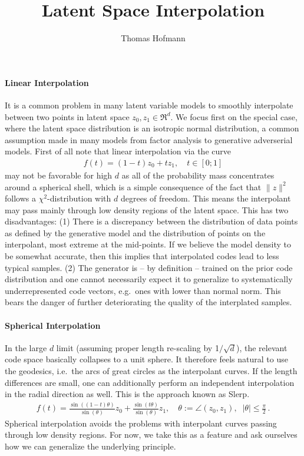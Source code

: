 \documentclass{article}
\author{Thomas Hofmann}
\title{Latent Space Interpolation}
\begin{document}
\maketitle

\paragraph{Linear Interpolation} It is a common problem in many latent variable models to smoothly interpolate between two points in latent space $z_0,z_1 \in \Re^d$. We focus first on the special case, where the latent space distribution is an isotropic normal distribution, a common assumption made in many models from factor analysis to generative adverserial models. 
%
First of all note that linear interpolation via the curve
\begin{align}
f(t) = (1-t) z_0 + t z_1, \quad t \in [0;1]
\end{align}
may not be favorable for high $d$ as all of the probability mass concentrates around a spherical shell, which is a simple consequence  of the fact that $\|z\|^2$ follows a $\chi^2$-distribution with $d$ degrees of freedom. This means the interpolant may pass mainly through low density regions of the latent space. This has two disadvantages: (1) There is a discrepancy between the distribution of data points as defined by the generative model and the distribution of points on the interpolant, most extreme at the mid-points. If we believe the model density to be somewhat accurate, then this  implies that interpolated codes lead to less typical samples. (2) The generator is -- by definition -- trained on the prior code distribution and one cannot necessarily expect it to generalize to systematically underrepresented code vectors, e.g.~ones with lower than normal norm. This bears the danger of further deteriorating the quality of the interplated samples. 

\paragraph{Spherical Interpolation} In the large $d$ limit (assuming proper length re-scaling by 1$/\sqrt{d}$), the relevant code space basically collapses to a unit sphere. It therefore feels natural to use the geodesics, i.e.~the arcs of great circles as the interpolant curves. If the length differences are small, one can additionally perform an independent interpolation in the radial direction as well. This is the approach known as Slerp. 
\begin{align}
f(t) = \frac{\sin((1-t) \theta)}{\sin(\theta)} z_0 + \frac{\sin(t\theta)}{\sin(\theta)} z_1, \quad \theta := \angle(z_0,z_1), \;\; |\theta| \le \frac \pi 2\,.
\end{align}
Spherical interpolation avoids the problems with interpolant curves passing through low density regions. For now, we take this as a feature and ask ourselves how we can generalize the underlying principle. 
\end{document}
